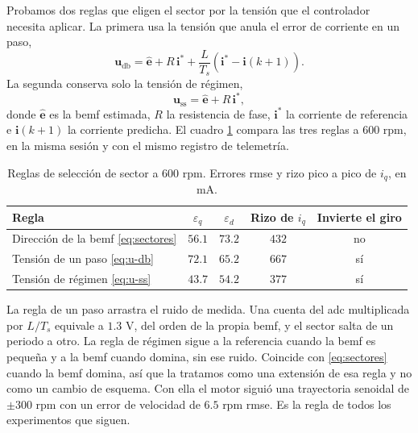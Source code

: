\documentclass[../../../Tesis_JALS_Maestria.tex]{subfiles}
\begin{document}
Probamos dos reglas que eligen el sector por la tensión que el controlador necesita aplicar. La primera usa la tensión que anula el error de corriente en un paso,
\begin{equation}
    \mathbf{u}_\mathrm{db} = \hat{\mathbf{e}} + R\,\mathbf{i}^* + \frac{L}{T_s}\left(\mathbf{i}^* - \mathbf{i}(k+1)\right).
    \label{eq:u-db}
\end{equation}
La segunda conserva solo la tensión de régimen,
\begin{equation}
    \mathbf{u}_\mathrm{ss} = \hat{\mathbf{e}} + R\,\mathbf{i}^*,
    \label{eq:u-ss}
\end{equation}
donde $\hat{\mathbf{e}}$ es la \acrshort{bemf} estimada, $R$ la resistencia de fase, $\mathbf{i}^*$ la corriente de referencia e $\mathbf{i}(k+1)$ la corriente predicha. El cuadro \ref{tab:sector} compara las tres reglas a $600$ rpm, en la misma sesión y con el mismo registro de telemetría.

\begin{table}[htbp]
    \centering
    \caption{Reglas de selección de sector a $600$ rpm. Errores \acrshort{rmse} y rizo pico a pico de $i_q$, en mA.}
    \label{tab:sector}
    \begin{tabular}{lcccc}
        \toprule
        Regla & $\varepsilon_q$ & $\varepsilon_d$ & Rizo de $i_q$ & Invierte el giro \\
        \midrule
        Dirección de la \acrshort{bemf} \eqref{eq:sectores} & $56.1$ & $73.2$ & $432$ & no \\
        Tensión de un paso \eqref{eq:u-db} & $72.1$ & $65.2$ & $667$ & sí \\
        Tensión de régimen \eqref{eq:u-ss} & $43.7$ & $54.2$ & $377$ & sí \\
        \bottomrule
    \end{tabular}
\end{table}

La regla de un paso arrastra el ruido de medida. Una cuenta del \acrshort{adc} multiplicada por $L/T_s$ equivale a $1.3$ V, del orden de la propia \acrshort{bemf}, y el sector salta de un periodo a otro. La regla de régimen sigue a la referencia cuando la \acrshort{bemf} es pequeña y a la \acrshort{bemf} cuando domina, sin ese ruido. Coincide con \eqref{eq:sectores} cuando la \acrshort{bemf} domina, así que la tratamos como una extensión de esa regla y no como un cambio de esquema. Con ella el motor siguió una trayectoria senoidal de $\pm 300$ rpm con un error de velocidad de $6.5$ rpm \acrshort{rmse}. Es la regla de todos los experimentos que siguen.
\end{document}
